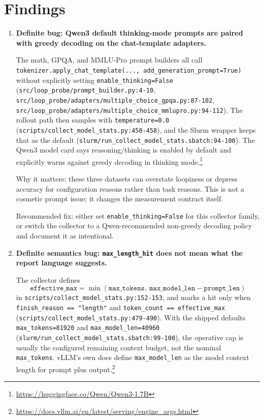 \documentclass[11pt]{article}
\begin{document}
\section*{Findings}
\begin{enumerate}
\item \textbf{Definite bug: Qwen3 default thinking-mode prompts are paired with greedy
decoding on the chat-template adapters.}

The math, GPQA, and MMLU-Pro prompt builders all call
\texttt{tokenizer.apply\_chat\_template(..., add\_generation\_prompt=True)} without
explicitly setting \texttt{enable\_thinking=False}
(\texttt{src/loop\_probe/prompt\_builder.py:4-10},
\texttt{src/loop\_probe/adapters/multiple\_choice\_gpqa.py:87-102},
\texttt{src/loop\_probe/adapters/multiple\_choice\_mmlupro.py:94-112}). The rollout
path then samples with \texttt{temperature=0.0}
(\texttt{scripts/collect\_model\_stats.py:450-458}), and the Slurm wrapper keeps that
as the default (\texttt{slurm/run\_collect\_model\_stats.sbatch:94-100}). The Qwen3
model card says reasoning/thinking is enabled by default and explicitly warns against
greedy decoding in thinking mode.\footnote{\url{https://huggingface.co/Qwen/Qwen3-1.7B}}

Why it matters: these three datasets can overstate loopiness or depress accuracy for
configuration reasons rather than task reasons. This is not a cosmetic prompt issue;
it changes the measurement contract itself.

Recommended fix: either set \texttt{enable\_thinking=False} for this collector family,
or switch the collector to a Qwen-recommended non-greedy decoding policy and document
it as intentional.

\item \textbf{Definite semantics bug: \texttt{max\_length\_hit} does not mean what the
report language suggests.}

The collector defines
\[
\texttt{effective\_max} = \min(\texttt{max\_tokens},\ \texttt{max\_model\_len} - \texttt{prompt\_len})
\]
in \texttt{scripts/collect\_model\_stats.py:152-153}, and marks a hit only when
\texttt{finish\_reason == "length"} and \texttt{token\_count == effective\_max}
(\texttt{scripts/collect\_model\_stats.py:479-490}). With the shipped defaults
\texttt{max\_tokens=81920} and \texttt{max\_model\_len=40960}
(\texttt{slurm/run\_collect\_model\_stats.sbatch:99-100}), the operative cap is
usually the configured remaining context budget, not the nominal \texttt{max\_tokens}.
vLLM's own docs define \texttt{max\_model\_len} as the model context length for
prompt plus output.\footnote{\url{https://docs.vllm.ai/en/latest/serving/engine_args.html}}


\end{enumerate}
\end{document}
